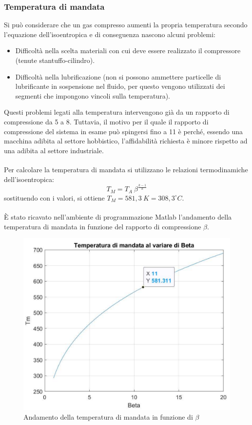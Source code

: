 \subsubsection{Temperatura di mandata}Si può considerare che un gas compresso aumenti la propria temperatura secondo l’equazione dell’isoentropica e di conseguenza nascono alcuni problemi:
\begin{itemize}
    \item Difficoltà nella scelta materiali con cui deve essere realizzato il compressore (tenute stantuffo-cilindro). 
    \item Difficoltà nella lubrificazione (non si possono ammettere particelle di lubrificante in sospensione nel fluido, per questo vengono utilizzati dei segmenti che impongono vincoli sulla temperatura).
\end{itemize}
Questi problemi legati alla temperatura intervengono già da un rapporto di compressione da 5 a 8. Tuttavia, il motivo per il quale il rapporto di compressione del sistema in esame può spingersi fino a 11 è perché, essendo una macchina adibita al settore hobbistico, l’affidabilità richiesta è minore rispetto ad una adibita al settore industriale.\\
\\
Per calcolare la temperatura di mandata si utilizzano le relazioni termodinamiche dell’isoentropica: 
\begin{equation}
    T_M=T_A\ \beta^\frac{k-1}{k}
\end{equation}
sostituendo con i valori, si ottiene $T_M=581,3\ K=308,3^\circ C$.\\
\\
È stato ricavato nell’ambiente di programmazione Matlab l’andamento della temperatura di mandata in funzione del rapporto di compressione $\beta$. 
\begin{figure}[h]
    \centering
    \includegraphics[scale=0.6]{Immagini/GraficoTmBeta.png}
    \caption{Andamento della temperatura di mandata in funzione di $\beta$}
    \label{fig:GraficoTmBeta}
\end{figure}
